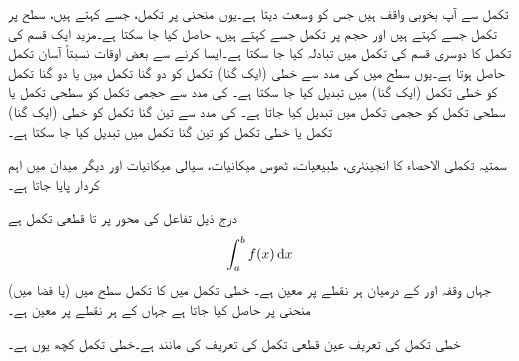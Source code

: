 تکمل سے آپ بخوبی واقف ہیں جس کو  وسعت دیتا ہے۔یوں منحنی پر تکمل، جسے  کہتے ہیں، سطح پر تکمل جسے  کہتے ہیں اور حجم پر تکمل جسے  کہتے ہیں،  حاصل کیا جا سکتا ہے۔مزید ایک قسم کی تکمل کا دوسری قسم کی تکمل میں تبادلہ کیا جا سکتا ہے۔ایسا کرنے سے بعض اوقات نسبتاً آسان تکمل حاصل ہوتا ہے۔یوں سطح میں   کی مدد سے خطی (ایک گنا) تکمل کو دو گنا تکمل میں یا دو گنا تکمل کو خطی تکمل (ایک گنا) میں تبدیل کیا جا سکتا ہے۔  کی مدد سے حجمی تکمل کو سطحی تکمل یا سطحی تکمل کو حجمی تکمل میں تبدیل کیا جاتا ہے۔ کی مدد سے تین گنا تکمل کو خطی (ایک گنا) تکمل یا خطی تکمل کو تین گنا تکمل میں تبدیل کیا جا سکتا ہے۔

سمتیہ تکملی الاحصاء کا انجینئری، طبیعیات، ٹھوس میکانیات، سیالی میکانیات اور دیگر میدان میں اہم کردار پایا جاتا ہے۔

 درج ذیل  تفاعل  کی محور  پر  تا  قطعی تکمل ہے
\begin{align}\label{مساوات_سمتی_تکمل_قطعی}
\int_a^b f(x)\dif x
\end{align}
جہاں وقفہ  اور  کے درمیان  ہر نقطے پر  معین ہے۔ خطی تکمل میں  کا تکمل سطح میں (یا فضا میں) منحنی  پر حاصل کیا جاتا ہے جہاں  کے ہر نقطے پر  معین ہے۔

خطی تکمل کی تعریف عین قطعی تکمل کی تعریف کی مانند ہے۔خطی تکمل کچھ یوں ہے۔

